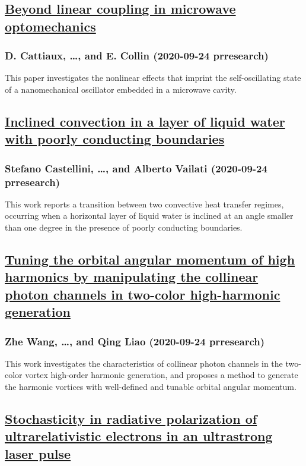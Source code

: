 \subsection*{\href{http://link.aps.org/doi/10.1103/PhysRevResearch.2.033480}{Beyond linear coupling in microwave optomechanics}}
\subsubsection*{D. Cattiaux, \dots, and E. Collin (2020-09-24 prresearch)}
This paper investigates the nonlinear effects that imprint the self-oscillating state of a nanomechanical oscillator embedded in a microwave cavity.
\subsection*{\href{http://link.aps.org/doi/10.1103/PhysRevResearch.2.033481}{Inclined convection in a layer of liquid water with poorly conducting boundaries}}
\subsubsection*{Stefano Castellini, \dots, and Alberto Vailati (2020-09-24 prresearch)}
This work reports a transition between two convective heat transfer regimes, occurring when a horizontal layer of liquid water is inclined at an angle smaller than one degree in the presence of poorly conducting boundaries.
\subsection*{\href{http://link.aps.org/doi/10.1103/PhysRevResearch.2.033482}{Tuning the orbital angular momentum of high harmonics by manipulating the collinear photon channels in two-color high-harmonic generation}}
\subsubsection*{Zhe Wang, \dots, and Qing Liao (2020-09-24 prresearch)}
This work investigates the characteristics of collinear photon channels in the two-color vortex high-order harmonic generation, and proposes a method to generate the harmonic vortices with well-defined and tunable orbital angular momentum.
\subsection*{\href{http://link.aps.org/doi/10.1103/PhysRevResearch.2.033483}{Stochasticity in radiative polarization of ultrarelativistic electrons in an ultrastrong laser pulse}}
